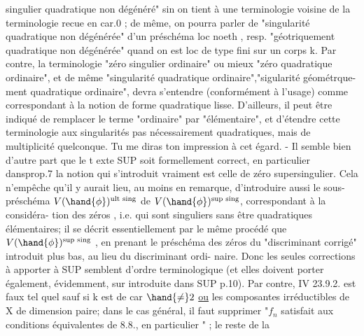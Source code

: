 
singulier quadratique  non dégénéré" sin on tient à une terminologie
voisine de la terminologie  recue en car.0 ; de même, on pourra
parler de "singularité quadratique non dégénérée" d'un préschéma loc
noeth , resp. "géotriquement  quadratique non dégénérée" quand on est
loc de type fini sur un corps k.  Par contre, la terminologie
"zéro singulier ordinaire" ou mieux "zéro quadratique ordinaire",
et de même "singularité quadratique ordinaire","sigularité géométrque-%
ment quadratique ordinaire",  devra s'entendre (conformément à l'usage)
comme correspondant à la notion de forme quadratique lisse. D'ailleurs,
il peut être indiqué de remplacer le terme "ordinaire" par "élémentaire",
et d'étendre cette terminologie aux singularités pas nécessairement
quadratiques, mais de multiplicité quelconque. Tu me diras ton impression
à cet égard.   -    Il semble bien d'autre part que le t exte SUP soit
formellement correct, en particulier dans\hand{/}prop.7  la notion qui s'introduit
vraiment est celle de zéro supersingulier.  Cela n'empêche qu'il y aurait
lieu, au moins en remarque, d'introduire aussi  le sous-%
préschéma  $V(\hand{\phi})^{\text{ult sing}}$  de $V(\hand{\phi})^{\text{sup sing}}$, correspondant à la considéra-%
tion des zéros , i.e.  qui sont singuliers sans être
quadratiques élémentaires; il se décrit essentiellement par le même
procédé que $V(\hand{\phi})^{\text{sup sing}}$  , en prenant le préschéma des zéros du
"discriminant corrigé"  introduit plus bas, au lieu du discriminant ordi-%
naire.  Donc les seules corrections à apporter à SUP semblent d'ordre
terminologique (et elles doivent porter également, évidemment, sur 
introduite dans SUP p.10\hand{/}).  Par contre,  IV 23.9.2. est faux tel quel
sauf si k est de car $\hand{\neq} 2$ \uline{ou} les composantes irréductibles de X  de
dimension paire; dans le cas général, il faut supprimer "$f_n$ satisfait
aux conditions équivalentes de 8.8., en particulier " ; le reste de la

